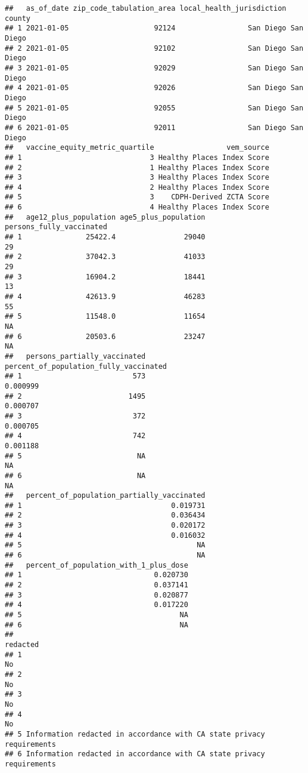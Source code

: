 \documentclass[
]{article}
\begin{document}
\begin{verbatim}
##   as_of_date zip_code_tabulation_area local_health_jurisdiction    county
## 1 2021-01-05                    92124                 San Diego San Diego
## 2 2021-01-05                    92102                 San Diego San Diego
## 3 2021-01-05                    92029                 San Diego San Diego
## 4 2021-01-05                    92026                 San Diego San Diego
## 5 2021-01-05                    92055                 San Diego San Diego
## 6 2021-01-05                    92011                 San Diego San Diego
##   vaccine_equity_metric_quartile                 vem_source
## 1                              3 Healthy Places Index Score
## 2                              1 Healthy Places Index Score
## 3                              3 Healthy Places Index Score
## 4                              2 Healthy Places Index Score
## 5                              3    CDPH-Derived ZCTA Score
## 6                              4 Healthy Places Index Score
##   age12_plus_population age5_plus_population persons_fully_vaccinated
## 1               25422.4                29040                       29
## 2               37042.3                41033                       29
## 3               16904.2                18441                       13
## 4               42613.9                46283                       55
## 5               11548.0                11654                       NA
## 6               20503.6                23247                       NA
##   persons_partially_vaccinated percent_of_population_fully_vaccinated
## 1                          573                               0.000999
## 2                         1495                               0.000707
## 3                          372                               0.000705
## 4                          742                               0.001188
## 5                           NA                                     NA
## 6                           NA                                     NA
##   percent_of_population_partially_vaccinated
## 1                                   0.019731
## 2                                   0.036434
## 3                                   0.020172
## 4                                   0.016032
## 5                                         NA
## 6                                         NA
##   percent_of_population_with_1_plus_dose
## 1                               0.020730
## 2                               0.037141
## 3                               0.020877
## 4                               0.017220
## 5                                     NA
## 6                                     NA
##                                                                redacted
## 1                                                                    No
## 2                                                                    No
## 3                                                                    No
## 4                                                                    No
## 5 Information redacted in accordance with CA state privacy requirements
## 6 Information redacted in accordance with CA state privacy requirements
\end{verbatim}
\end{document}
